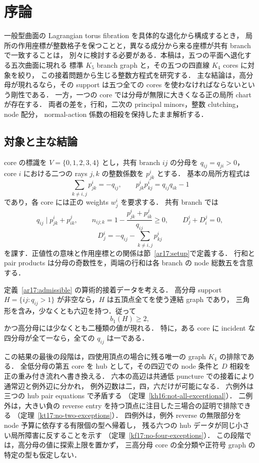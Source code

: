 \section{序論}
\label{ar17:introduction}

一般型曲面の Lagrangian torus fibration を具体的な退化から構成するとき，
局所の作用座標が整数格子を保つことと，異なる成分から来る座標が共有 branch で一致することは，
別々に検討する必要がある．本稿は，五つの平面へ退化する五次曲面に現れる
標準 $K_5$ branch graph と，その五つの四直線 $K_4$ cores に対象を絞り，
この接着問題から生じる整数方程式を研究する．
主な結論は，高分母が現れるなら，その support は五つ全ての cores を使わなければならないという剛性である．
一方，一つの core では分母が無限に大きくなる正の局所 chart が存在する．
両者の差を，行和，二次の principal minors，整数 clutching，node 配分，
normal-action 係数の相殺を保持したまま解析する．

\subsection{対象と主な結論}

core の標識を $V=\{0,1,2,3,4\}$ とし，共有 branch $ij$ の分母を
$q_{ij}=q_{ji}>0$，core $i$ における二つの rays $j,k$ の整数係数を $p^i_{jk}$ とする．
基本の局所方程式は
\[
 \sum_{k\ne i,j}p^i_{jk}=-q_{ij},\qquad
 p^i_{jk}p^i_{kj}=q_{ij}q_{ik}-1
\]
であり，各 core には正の weights $w^i_j$ を要求する．
共有 branch では
\[
 q_{ij}\mid p^i_{jk}+p^j_{ik},\qquad
 n_{ij;k}=1-\frac{p^i_{jk}+p^j_{ik}}{q_{ij}}\ge0,
 \qquad D^i_j+D^j_i=0,
\]
\[
 D^i_j=-q_{ij}-\sum_{k\ne i,j}p^i_{kj}
\]
を課す．正値性の意味と作用座標との関係は節~\ref{ar17:setup}で定義する．
行和と pair products は分母の奇数性を，両端の行和は各 branch の node 総数五を含意する．

\begin{theorem}
\label{ar17:main-support}
定義~\ref{ar17:admissible} の算術的接着データを考える．
高分母 support $H=\{ij:q_{ij}>1\}$ が非空なら，$H$ は五頂点全てを使う連結 graph であり，
三角形を含み，少なくとも六辺を持つ．従って
\[
 b_1(H)\ge2,
\]
かつ高分母には少なくとも二種類の値が現れる．
特に，ある core に incident な四分母が全て一なら，全ての $q_{ij}$ は一である．
\end{theorem}

この結果の最後の段階は，四使用頂点の場合に残る唯一の graph $K_4$ の排除である．
全低分母の第五 core を hub として，その四辺での node 条件と $D$ 相殺を正の重み付き流れへ書き換える．
六本の高辺は共通低 puncture での接着により通常辺と例外辺に分かれ，
例外辺数は二，四，六だけが可能になる．
六例外は三つの hub pair equations で矛盾する
（定理~\ref{kh16:not-all-exceptional}）．
二例外は，大きい負の reverse entry を持つ頂点に注目した三場合の証明で排除できる
（定理~\ref{kt17:no-two-exceptions}）．
四例外は，例外 reverse の無限部分を node 予算に依存する有限個の型へ帰着し，
残る六つの hub データが同じ小さい局所障害に反することを示す
（定理~\ref{kf17:no-four-exceptions}）．
この段階では，高分母の値に探索上限を置かず，
三高分母 core の全分類や正符号 graph の特定の型も仮定しない．

